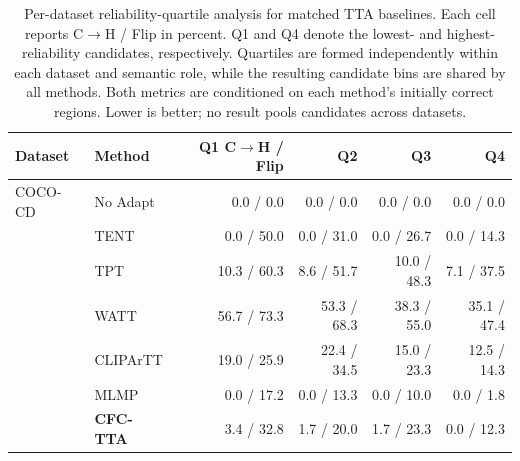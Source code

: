 \begin{table}[t]
\centering
\scriptsize
\setlength{\tabcolsep}{4pt}
\caption{Per-dataset reliability-quartile analysis for matched TTA baselines. Each cell reports C$\rightarrow$H / Flip in percent. Q1 and Q4 denote the lowest- and highest-reliability candidates, respectively. Quartiles are formed independently within each dataset and semantic role, while the resulting candidate bins are shared by all methods. Both metrics are conditioned on each method's initially correct regions. Lower is better; no result pools candidates across datasets.}
\label{tab:baseline-reliability-quartiles-per-dataset}
\begin{tabular}{llrrrr}
\toprule
Dataset & Method & Q1 C$\rightarrow$H / Flip & Q2 & Q3 & Q4 \\
\midrule
COCO-CD & No Adapt & 0.0 / 0.0 & 0.0 / 0.0 & 0.0 / 0.0 & 0.0 / 0.0 \\
 & TENT & 0.0 / 50.0 & 0.0 / 31.0 & 0.0 / 26.7 & 0.0 / 14.3 \\
 & TPT & 10.3 / 60.3 & 8.6 / 51.7 & 10.0 / 48.3 & 7.1 / 37.5 \\
 & WATT & 56.7 / 73.3 & 53.3 / 68.3 & 38.3 / 55.0 & 35.1 / 47.4 \\
 & CLIPArTT & 19.0 / 25.9 & 22.4 / 34.5 & 15.0 / 23.3 & 12.5 / 14.3 \\
 & MLMP & 0.0 / 17.2 & 0.0 / 13.3 & 0.0 / 10.0 & 0.0 / 1.8 \\
 & \textbf{CFC-TTA} & 3.4 / 32.8 & 1.7 / 20.0 & 1.7 / 23.3 & 0.0 / 12.3 \\
\bottomrule
\end{tabular}
\end{table}
